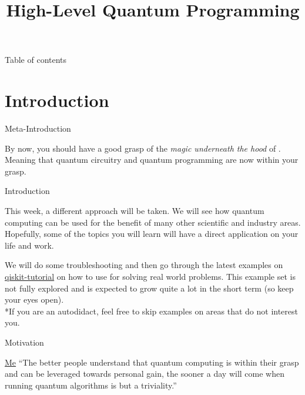 \documentclass[aspectratio=43]{beamer}
\title{High-Level Quantum Programming}
\begin{document}
\begin{frame}
	\titlepage
\end{frame}


\begin{frame}{Table of contents}
	\begin{card}
		\tableofcontents
	\end{card}
\end{frame}


\section{Introduction}
\begin{frame}{Meta-Introduction}
    \begin{card}
        By now, you should have a good grasp of the \textit{magic underneath the hood} of \qc. Meaning that quantum circuitry and quantum programming are now within your grasp.
    \end{card}
\pagenumber
\end{frame}

\begin{frame}{Introduction}
    \begin{cardTiny}
        This week, a different approach will be taken. We will see how quantum computing can be used for the benefit of many other scientific and industry areas. Hopefully, some of the topics you will learn will have a direct application on your life and work. 
    \end{cardTiny}
    \begin{cardTiny}
        We will do some \qka troubleshooting and then go through the latest examples on \href{https://github.com/Qiskit/qiskit-tutorial}{qiskit-tutorial} on how to use \qsa for solving real world problems. This example set is not fully explored and is expected to grow quite a lot in the short term (so keep your eyes open).\\
        \small{*If you are an autodidact, feel free to skip examples on areas that do not interest you.}
    \end{cardTiny}
\pagenumber
\end{frame}

\begin{frame}{Motivation}
    \begin{card}
    \begin{chapquote}[2pt]{\href{https://msramalho.github.io/}{Me}}
        ``The better people understand that quantum computing is within their grasp and can be leveraged towards personal gain, the sooner a day will come when running quantum algorithms is but a triviality.''
    \end{chapquote}
    \end{card}
\pagenumber
\end{frame}
\end{document}
